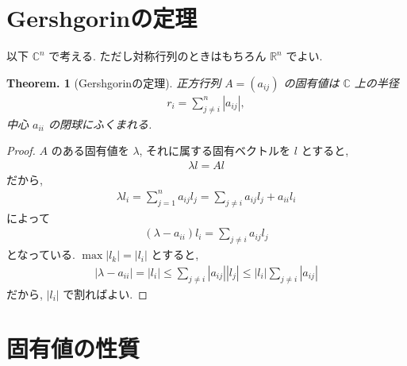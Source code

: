 \documentclass[openany, a4paper, oneside]{jsbook}
\theoremstyle{break}
\theoremstyle{breakdefn}
\newtheorem{thm}{Theorem.}[section]
\newcommand{\abs}[1]{\left|#1\right|}
\newcommand{\rbk}[1]{\left (#1\right)}
\begin{document}
\section{Gershgorinの定理}


以下 $\mathbb{C}^n$ で考える. ただし対称行列のときはもちろん $\mathbb{R}^n$  でよい.
\begin{thm}[Gershgorinの定理]
 正方行列 $A = (a_{ij})$ の固有値は $\mathbb{C}$ 上の半径
  \begin{align}
   r_i
   =
   \sum_{j\neq i}^n \abs{a_{ij}},
  \end{align}
 中心 $a_{ii}$ の閉球にふくまれる.
\end{thm}

\begin{proof}
$A$ のある固有値を $\lambda$, それに属する固有ベクトルを
$l$ とすると,
\begin{align}
 \lambda l
 =
 Al
\end{align}
だから,
\begin{align}
 \lambda l_i
 =
 \sum_{j=1}^n
 a_{ij} l_j
 =
 \sum_{j \neq i} a_{ij} l_j  + a_{ii} l_i
\end{align}
によって
\begin{align}
 \rbk{\lambda - a_{ii}} l_i
 =
 \sum_{j \neq i} a_{ij} l_j
\end{align}
となっている.
$\max \abs{l_k} = \abs{l_i}$ とすると,
\begin{align}
 \abs{\lambda - a_{ii}}
 =
 \abs{l_i}
 \le
 \sum_{j \neq i} \abs{a_{ij}} \abs{l_j}
 \le
 \abs{l_i} \sum_{j \neq i} \abs{a_{ij}}
\end{align}
だから, $|l_i|$ で割ればよい.
\end{proof}
\section{固有値の性質}
\end{document}
